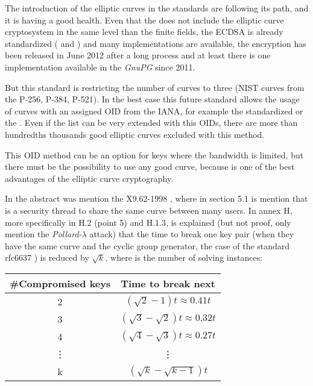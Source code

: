\documentclass[10pt,a4paper,twoside]{llncs}
\begin{document}
The introduction of the elliptic curves in the standards are following its path, and it is having a good health. Even that the \cite{rfc4880} does not include the elliptic curve cryptosystem in the same level than the finite fields, the ECDSA is already standardized (\cite{NIST186-3} and \cite{rfc5832}) and many implementations are available, the encryption has been released in June 2012 after a long process \cite{rfc6637} and at least there is one implementation available in the \emph{GnuPG} since 2011.

But this standard is restricting the number of curves to three (NIST curves from the \cite{NIST186-3} P-256, P-384, P-521). In the best case this future standard allows the usage of curves with an assigned OID from the IANA, for example the \cite{brainpool} standardized or the \cite{sec2}. Even if the list can be very extended with this OIDs, there are more than hundredths thousands good elliptic curves excluded with this method.

This OID method can be an option for keys where the bandwidth is limited, but there must be the possibility to use any good curve, because is one of the best advantages of the elliptic curve cryptography.

In the abstract was mention the X9.62-1998\cite{X9.62-1998} , where in section 5.1 is mention that is a security thread to share the same curve between many users. In annex H, more specifically in H.2 (point 5) and H.1.3, is explained (but not proof, only mention the \emph{Pollard-$\lambda$} attack) that the time to break one key pair (when they have the same curve and the cyclic group generator, the case of the standard rfc6637 \cite{rfc6637}) is reduced by $\sqrt{k}$, where is the number of solving instances:

\begin{center}
 \begin{tabular}{|c|c|}
  \hline
  \#Compromised keys & Time to break next \\
  \hline
  2 & $(\sqrt{2}-1)t\approx0.41t$ \\
  \hline
  3 & $(\sqrt{3}-\sqrt{2})t\approx0.32t$ \\
  \hline
  4 & $(\sqrt{4}-\sqrt{3})t\approx0.27t$ \\
  \hline
  \vdots & \vdots \\
  \hline
  k & $(\sqrt{k}-\sqrt{k-1})t$ \\
  \hline
 \end{tabular}
\end{center}
\end{document}
